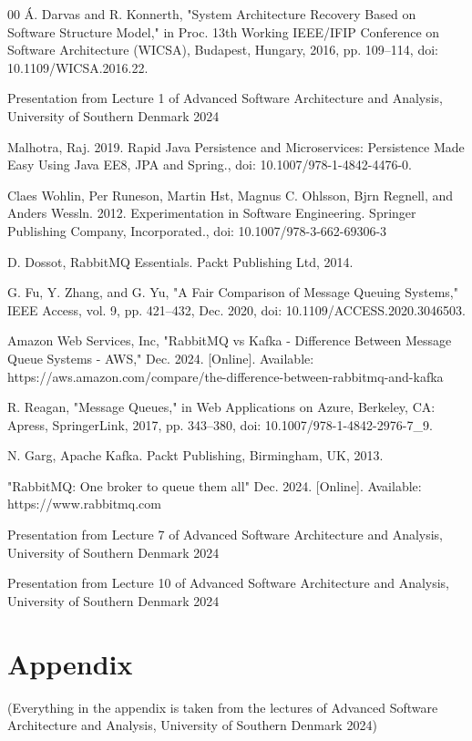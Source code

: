 \documentclass[conference]{IEEEtran}
\begin{document}
\begin{thebibliography}{00}
 Á. Darvas and R. Konnerth, "System Architecture Recovery Based on Software Structure Model," in Proc. 13th Working IEEE/IFIP Conference on Software Architecture (WICSA), Budapest, Hungary, 2016, pp. 109–114, doi: 10.1109/WICSA.2016.22.

 Presentation from Lecture 1 of Advanced
Software Architecture and Analysis, University of Southern Denmark 2024

 Malhotra, Raj. 2019. Rapid Java Persistence and Microservices: Persistence Made Easy Using Java EE8, JPA and Spring., doi: 10.1007/978-1-4842-4476-0. 

 Claes Wohlin, Per Runeson, Martin Hst, Magnus C. Ohlsson, Bjrn Regnell, and Anders Wessln. 2012. Experimentation in Software Engineering. Springer Publishing Company, Incorporated., doi: 10.1007/978-3-662-69306-3

 D. Dossot, RabbitMQ Essentials. Packt Publishing Ltd, 2014.

 G. Fu, Y. Zhang, and G. Yu, "A Fair Comparison of Message Queuing Systems," IEEE Access, vol. 9, pp. 421–432, Dec. 2020, doi: 10.1109/ACCESS.2020.3046503.

 Amazon Web Services, Inc, "RabbitMQ vs Kafka - Difference Between Message Queue Systems - AWS," Dec. 2024. [Online]. Available: https://aws.amazon.com/compare/the-difference-between-rabbitmq-and-kafka

 R. Reagan, "Message Queues," in Web Applications on Azure, Berkeley, CA: Apress, SpringerLink, 2017, pp. 343–380, doi: 10.1007/978-1-4842-2976-7\_9.

 N. Garg, Apache Kafka. Packt Publishing, Birmingham, UK, 2013.

 "RabbitMQ: One broker to queue them all" Dec. 2024. [Online]. Available: https://www.rabbitmq.com

Presentation from Lecture 7 of Advanced
Software Architecture and Analysis, University of Southern Denmark 2024

Presentation from Lecture 10 of Advanced
Software Architecture and Analysis, University of Southern Denmark 2024

\end{thebibliography}

\section*{Appendix}
(Everything in the appendix is taken from the lectures of Advanced
Software Architecture and Analysis, University of Southern Denmark 2024)
\end{document}
